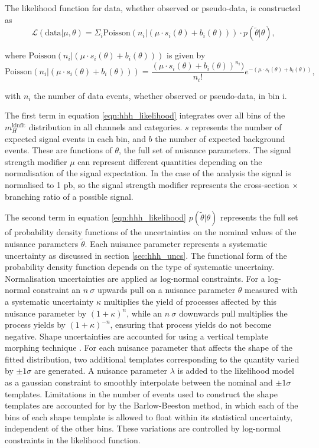 The likelihood function for data, whether observed or pseudo-data, is constructed as 
\begin{equation} \label{eqn:hhh_likelihood}
\mathcal{L}(\text{data}|\mu, \theta) = \Sigma_i\text{Poisson}(n_{i}|(\mu\cdot s_i(\theta) + b_i(\theta)) )\cdot p(\tilde{\theta}|\theta),
\end{equation}

where $\text{Poisson}(n_{i}|(\mu\cdot s_i(\theta)+b_i(\theta)))$ is given by
\begin{equation}\label{eqn:hhh_poisson}
\text{Poisson}(n_{i}|(\mu\cdot s_i(\theta)+b_i(\theta))) = \frac{(\mu\cdot s_i(\theta) + b_i(\theta))^{n_i})}{n_i!}e^{-(\mu\cdot s_i(\theta)+b_i(\theta))},
\end{equation}

with $n_i$ the number of 
data events, whether observed or pseudo-data, in bin i.

The first term in equation \ref{eqn:hhh_likelihood} integrates over all bins of the $m_{H}^{\text{kinfit}}$ distribution 
in all channels and categories. $s$ represents the number of expected signal events
in each bin, and $b$ the number of expected background events. These are functions of 
$\theta$, the full set of nuisance parameters. The signal strength
modifier $\mu$ can represent different quantities depending on the normalisation of the 
signal expectation. In the case of the \Htohhtobbtautau analysis the signal is normalised
to 1 pb, so the signal strength modifier represents
the cross-section $\times$ branching ratio of a possible signal.

The second term in equation \ref{eqn:hhh_likelihood} $p(\tilde{\theta}|\theta)$ represents the full set of 
probability density functions of the uncertainties on the nominal
values of the nuisance parameters $\tilde{\theta}$. Each nuisance parameter represents a systematic uncertainty
as discussed in section \ref{sec:hhh_uncs}. The functional form of the probability density function
depends on the type of systematic uncertainy. Normalisation uncertainties are applied as log-normal constraints.
For a log-normal constraint an $n~\sigma$ upwards pull on a nuisance parameter $\theta$ measured with a systematic
uncertainty $\kappa$ multiplies the yield of processes affected by this nuisance parameter by $(1+\kappa)^n$, while
an $n~\sigma$ downwards pull multiplies the process yields by $(1+\kappa)^{-n}$, ensuring that process
yields do not become negative. Shape uncertainties are accounted for using a vertical template morphing
technique \cite{temp-morph-2011}. For each nuisance parameter that affects the shape of the fitted distribution, two additional
templates corresponding to the quantity varied by $\pm 1 \sigma$ are generated. A nuisance
parameter $\lambda$ is added to the likelihood model as a gaussian constraint to smoothly interpolate between
the nominal and $\pm 1\sigma$ templates. Limitations in the number of events used to construct the shape templates
are accounted for by the Barlow-Beeston method\cite{BarlowBeeston}, in which each of the bins of each 
shape template is allowed to float within its statistical uncertainty, independent of the other bins. These
variations are controlled by log-normal constraints in the likelihood function.

